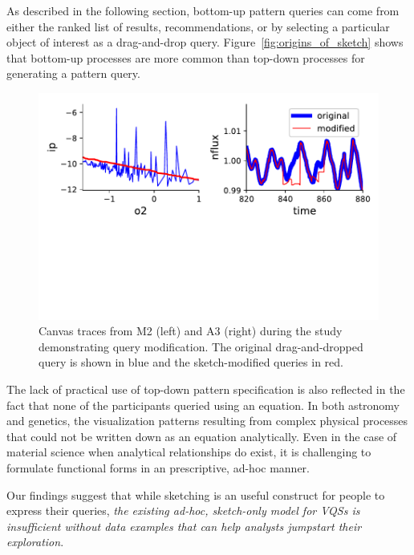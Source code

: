 As described in the following section,
bottom-up pattern queries can come from either
the ranked list of results,
recommendations, or by selecting a
particular object of interest as a drag-and-drop query.
Figure~\ref{fig:origins_of_sketch} shows that
bottom-up processes are more common
than top-down processes for generating a pattern query.
\begin{figure}[h!]
    \centering
    \includegraphics[width=\columnwidth]{figures/QueryModificationBySketch.pdf}
    \caption{Canvas traces from M2 (left) and A3 (right) during the study demonstrating query modification. The original drag-and-dropped query is shown in blue and the sketch-modified queries in red.}
    \label{query_modification}
    \vspace{-10pt}
\end{figure}
\par The lack of practical use of top-down pattern
specification is also reflected in the fact
that none of the participants queried using an equation.
In both astronomy and genetics, the visualization patterns
resulting from complex physical processes
that could not be written down as an equation analytically.
Even in the case of material science when analytical
relationships do exist, it is challenging to formulate
functional forms in an prescriptive, ad-hoc manner.
\par Our findings suggest that while sketching
is an useful construct for people to express their queries,
\emph{the existing ad-hoc, sketch-only model for VQSs
is insufficient without data examples
that can help analysts jumpstart their exploration}.
